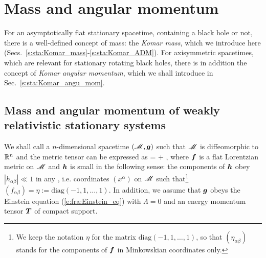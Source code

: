 

\section{Mass and angular momentum} \label{s:sta:mass_angul_mom}

For an asymptotically flat stationary spacetime, containing a
black hole or not, there is a well-defined concept of mass: the \emph{Komar mass},
which we introduce here (Secs.~\ref{s:sta:Komar_mass}-\ref{s:sta:Komar_ADM}).
For axisymmetric spacetimes, which are relevant
for stationary rotating black holes, there is in addition the concept
of \emph{Komar angular momentum}, which we shall introduce in Sec.~\ref{s:sta:Komar_angu_mom}.

\subsection{Mass and angular momentum of weakly relativistic stationary systems}
\label{s:sta:weakly_relativistic}

We shall call 
a $n$-dimensional spacetime $(\mathscr{M},\bm{g})$
such that $\mathscr{M}$ is diffeomorphic to $\mathbb{R}^n$ and the metric tensor can be expressed as
\be \label{e:sta:weak_g_f_h}
     =  +  ,
\ee
where $\bm{f}$ is a flat Lorentzian metric on $\mathscr{M}$ and $\bm{h}$ is small in the following
sense: the components of $\bm{h}$ obey $|h_{\alpha\beta}| \ll 1$
in any ,
i.e. coordinates
$(x^\alpha)$ on $\mathscr{M}$ such that\footnote{We keep the notation $\eta$ for the matrix $\mathrm{diag}(-1,1,\ldots,1)$, so that
$(\eta_{\alpha\beta})$ stands for the components of $\bm{f}$ in Minkowskian coordinates only.}
$(f_{\alpha\beta}) = \eta := \mathrm{diag}(-1,1,\ldots,1)$.
In addition, we assume that $\bm{g}$
obeys the Einstein equation (\ref{e:fra:Einstein_eq}) with $\Lambda=0$
and an energy momentum tensor $\bm{T}$ of compact support.

